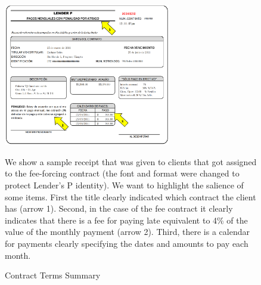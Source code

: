 \documentclass[oneside,11pt]{article}
\begin{document}
\begin{figure}[H]
     \caption{Contract Terms Summary}
    \label{PaperSlip}
    \begin{center}
        \includegraphics[width=0.65\textwidth]{Figuras/TicketLenderP.png}
    
    \end{center}
    \scriptsize
        We show a sample receipt that was given to clients that got assigned to the fee-forcing contract (the font and format were changed to protect Lender's P identity). We want to highlight the salience of some items. First the title clearly indicated which contract the client has (arrow 1). Second, in the case of the fee contract it clearly indicates that there is a fee for paying late equivalent to 4\% of the value of the monthly payment (arrow 2). Third, there is a calendar for payments clearly specifying the dates and amounts to pay each month. %
\end{figure}
\end{document}
